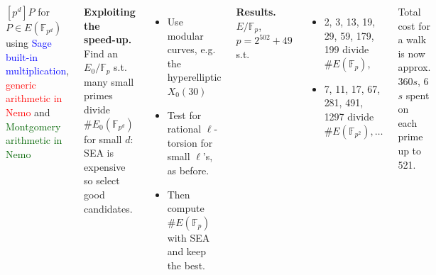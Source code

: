 \documentclass[25pt,a0paper,blockverticalspace=20mm]{tikzposter}
\def\F {\ensuremath{\mathbb{F}}}
\renewcommand{\paragraph}[1]{\smallskip\textbf{#1.}}
\begin{document}
\begin{columns}
{\begin{center}

\small $[p^d] P$ for $P \in E(\F_{p^d})$ using
\textcolor{blue}{Sage built-in multiplication},
\textcolor{red}{generic arithmetic in Nemo} and
\textcolor{darkgreen}{Montgomery arithmetic in Nemo}

\end{center}

\paragraph{Exploiting the speed-up} Find an $E_0/\F_p$ s.t. many small primes divide $\# E_0(\F_{p^d})$ for small $d$: SEA is expensive so select good candidates.
\begin{itemize}
\item Use modular curves, e.g. the hyperelliptic $X_0(30)$
\item Test for rational $\ell$-torsion for small $\ell$'s, as before.
\item Then compute $\#E(\F_p)$ with SEA and keep the best.
\end{itemize}

\paragraph{Results} $E/\F_p$, $p = 2^{502} + 49$ s.t.
\begin{itemize}
\item  2, 3, 13, 19, 29, 59, 179, 199 divide $\#E(\F_p)$,
\item 7, 11, 17, 67, 281, 491, 1297 divide $\#E(\F_{p^2}), \ldots$
\end{itemize}
Total cost for a walk is now approx. 360$s$, 6$s$ spent on each prime up to 521.

}





\end{columns}
\end{document}
